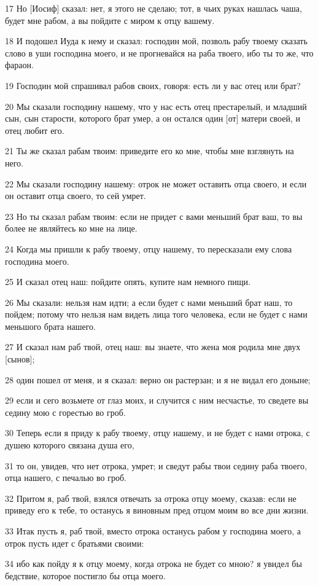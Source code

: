 \par 17 Но [Иосиф] сказал: нет, я этого не сделаю; тот, в чьих руках нашлась чаша, будет мне рабом, а вы пойдите с миром к отцу вашему.
\par 18 И подошел Иуда к нему и сказал: господин мой, позволь рабу твоему сказать слово в уши господина моего, и не прогневайся на раба твоего, ибо ты то же, что фараон.
\par 19 Господин мой спрашивал рабов своих, говоря: есть ли у вас отец или брат?
\par 20 Мы сказали господину нашему, что у нас есть отец престарелый, и младший сын, сын старости, которого брат умер, а он остался один [от] матери своей, и отец любит его.
\par 21 Ты же сказал рабам твоим: приведите его ко мне, чтобы мне взглянуть на него.
\par 22 Мы сказали господину нашему: отрок не может оставить отца своего, и если он оставит отца своего, то сей умрет.
\par 23 Но ты сказал рабам твоим: если не придет с вами меньший брат ваш, то вы более не являйтесь ко мне на лице.
\par 24 Когда мы пришли к рабу твоему, отцу нашему, то пересказали ему слова господина моего.
\par 25 И сказал отец наш: пойдите опять, купите нам немного пищи.
\par 26 Мы сказали: нельзя нам идти; а если будет с нами меньший брат наш, то пойдем; потому что нельзя нам видеть лица того человека, если не будет с нами меньшого брата нашего.
\par 27 И сказал нам раб твой, отец наш: вы знаете, что жена моя родила мне двух [сынов];
\par 28 один пошел от меня, и я сказал: верно он растерзан; и я не видал его доныне;
\par 29 если и сего возьмете от глаз моих, и случится с ним несчастье, то сведете вы седину мою с горестью во гроб.
\par 30 Теперь если я приду к рабу твоему, отцу нашему, и не будет с нами отрока, с душею которого связана душа его,
\par 31 то он, увидев, что нет отрока, умрет; и сведут рабы твои седину раба твоего, отца нашего, с печалью во гроб.
\par 32 Притом я, раб твой, взялся отвечать за отрока отцу моему, сказав: если не приведу его к тебе, то останусь я виновным пред отцом моим во все дни жизни.
\par 33 Итак пусть я, раб твой, вместо отрока останусь рабом у господина моего, а отрок пусть идет с братьями своими:
\par 34 ибо как пойду я к отцу моему, когда отрока не будет со мною? я увидел бы бедствие, которое постигло бы отца моего.

